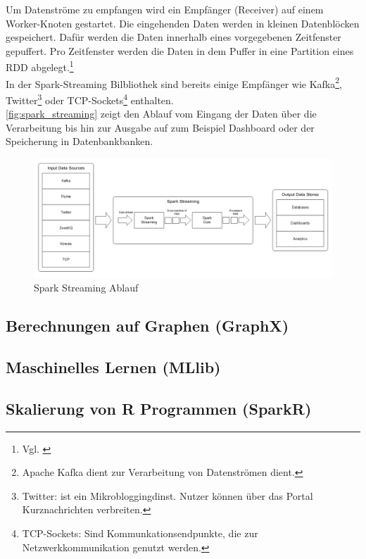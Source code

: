 \noindent
Um Datenströme zu empfangen wird ein Empfänger (Receiver) auf einem Worker-Knoten gestartet. Die eingehenden Daten werden in kleinen Datenblöcken gespeichert. Dafür werden die Daten innerhalb eines vorgegebenen Zeitfenster gepuffert. Pro Zeitfenster werden die Daten in dem Puffer in eine Partition eines RDD abgelegt.\footnote{Vgl. \cite{BDS16}} \\

\noindent
In der Spark-Streaming Bilbliothek sind bereits einige Empfänger wie Kafka\footnote{Apache Kafka dient zur Verarbeitung von Datenströmen dient.}, Twitter\footnote{Twitter: ist ein Mikrobloggingdinst. Nutzer können über das Portal Kurznachrichten verbreiten. } oder TCP-Sockets\footnote{TCP-Sockets: Sind Kommunkationsendpunkte, die zur Netzwerkkommunikation genutzt werden. } enthalten. \\
\autoref{fig:spark_streaming} zeigt den Ablauf vom Eingang der Daten über die Verarbeitung bis hin zur Ausgabe auf zum Beispiel Dashboard oder der Speicherung in Datenbankbanken.

\begin{figure}[h]
  \centering
  \includegraphics[width=\textwidth]{./bilder/spark_streaming.jpg}
  \caption{Spark Streaming Ablauf \cite{INFOQ_STREAMING}}\label{fig:spark_streaming}
\end{figure}





\newpage
\subsection{Berechnungen auf Graphen (GraphX)}

\newpage
\subsection{Maschinelles Lernen (MLlib)}\label{sec_sparkmlib}

\newpage
\subsection{Skalierung von R Programmen (SparkR)}\label{sec_sparkr}

